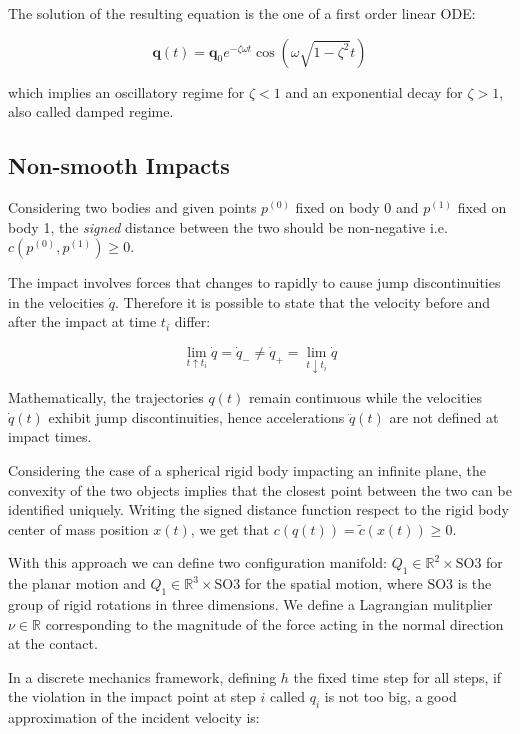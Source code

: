 The solution of the resulting equation is the one of a first order linear \ac{ODE}:

\begin{equation}
    \mathbf{q}(t) = \mathbf{q}_0 e^{-\zeta \omega t} \cos(\omega \sqrt{1 - \zeta ^2} t)
\end{equation}

which implies an oscillatory regime for $\zeta < 1$ and an exponential decay for $\zeta > 1$, also called damped regime.

\subsection{Non-smooth Impacts}

Considering two bodies and given points $p ^{(0)}$ fixed on body 0 and $p ^{(1)}$ fixed on body 1, the \textit{signed} distance between the two should be non-negative i.e. $c(p ^{(0)}, p ^{(1)}) \geq 0$.

The impact involves forces that changes to rapidly to cause jump discontinuities in the velocities $\dot{q}$. Therefore it is possible to state that the velocity before and after the impact at time $t_i$ differ:

\begin{equation}
    \lim _{t \uparrow t _i} \dot{q} = \dot{q} _{-} \neq \dot{q} _{+} = \lim _{t \downarrow t _i} \dot{q}
\end{equation}

Mathematically, the trajectories $q(t)$ remain continuous while the velocities $\dot{q}(t)$ exhibit jump discontinuities, hence accelerations $\ddot{q}(t)$ are not defined at impact times.

Considering the case of a spherical rigid body impacting an infinite plane, the convexity of the two objects implies that the closest point between the two can be identified uniquely.
Writing the signed distance function respect to the rigid body center of mass position $x(t)$, we get that $c(q(t)) = \tilde{c}(x(t)) \geq 0$.

With this approach we can define two configuration manifold: $Q _1 \in \mathbb{R} ^2 \times \mathrm{SO}3$ for the planar motion and $Q _1 \in \mathbb{R} ^3 \times \mathrm{SO}3$ for the spatial motion, where $\mathrm{SO}3$ is the group of rigid rotations in three dimensions. We define a Lagrangian mulitplier $\nu \in \mathbb{R}$ corresponding to the magnitude of the force acting in the normal direction at the contact.

In a discrete mechanics framework, defining $h$ the fixed time step for all steps, if the violation in the impact point at step $i$ called $q _i$ is not too big, a good approximation of the incident velocity is:

